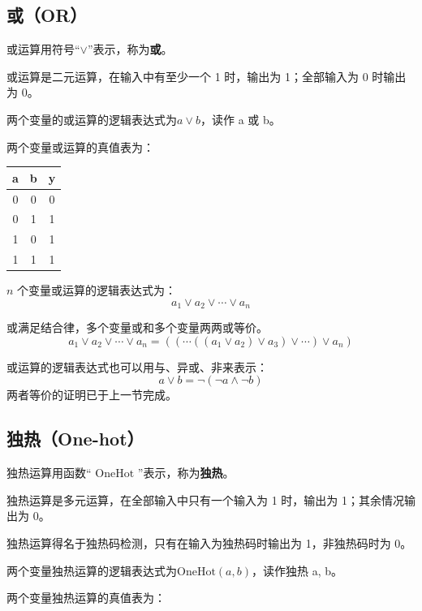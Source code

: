 \subsection{或（OR）}

或运算用符号“$\lor$”表示，称为\textbf{或}。

或运算是二元运算，在输入中有至少一个 1 时，输出为 1；全部输入为 0 时输出为 0。

两个变量的或运算的逻辑表达式为$a \lor b$，读作 a 或 b。

两个变量或运算的真值表为：

\begin{longtable}{|c|c|c|}
\hline
\textbf{a} & \textbf{b} & \textbf{y} \\ \hline
\endhead
0 & 0 & 0 \\ \hline
0 & 1 & 1 \\ \hline
1 & 0 & 1 \\ \hline
1 & 1 & 1 \\ \hline
\end{longtable}

$n$ 个变量或运算的逻辑表达式为：
$$a_1 \lor a_2 \lor \cdots \lor a_n$$

\begin{remark}{}{}
  或满足结合律，多个变量或和多个变量两两或等价。
  $$a_1 \lor a_2 \lor \cdots \lor a_n = (( \cdots ((a_1 \lor a_2) \lor a_3) \lor \cdots) \lor a_n)$$
\end{remark}

\begin{note}{}{}
  或运算的逻辑表达式也可以用与、异或、非来表示：
  $$a \lor b = \lnot (\lnot a \land \lnot b)$$
  两者等价的证明已于上一节完成。
\end{note}

\subsection{独热（One-hot）}

独热运算用函数“ $\mathrm{OneHot}$ ”表示，称为\textbf{独热}。

独热运算是多元运算，在全部输入中只有一个输入为 1 时，输出为 1；其余情况输出为 0。

\begin{note}{}{}
  独热运算得名于独热码检测，只有在输入为独热码时输出为 1，非独热码时为 0。
\end{note}

两个变量独热运算的逻辑表达式为$\mathrm{OneHot}(a, b)$，读作独热 a, b。

两个变量独热运算的真值表为：

